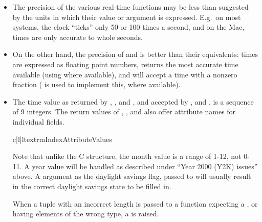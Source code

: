 \begin{itemize}
\item
The precision of the various real-time functions may be less than
suggested by the units in which their value or argument is expressed.
E.g.\ on most \UNIX{} systems, the clock ``ticks'' only 50 or 100 times a
second, and on the Mac, times are only accurate to whole seconds.

\item
On the other hand, the precision of  and
 is better than their \UNIX{} equivalents: times are
expressed as floating point numbers,  returns the
most accurate time available (using \UNIX{} 
where available), and  will accept a time with a
nonzero fraction (\UNIX{}  is used to implement
this, where available).

\item
The time value as returned by ,
, and , and accepted by
,  and ,
is a sequence of 9 integers.  The return values of ,
, and  also offer attribute
names for individual fields.

\begin{tableiii}{c|l|l}{textrm}{Index}{Attribute}{Values}
\end{tableiii}

Note that unlike the C structure, the month value is a
range of 1-12, not 0-11.  A year value will be handled as described
under ``Year 2000 (Y2K) issues'' above.  A  argument as the
daylight savings flag, passed to  will usually
result in the correct daylight savings state to be filled in.

When a tuple with an incorrect length is passed to a function
expecting a , or having elements of the wrong type, a
 is raised.

\end{itemize}

